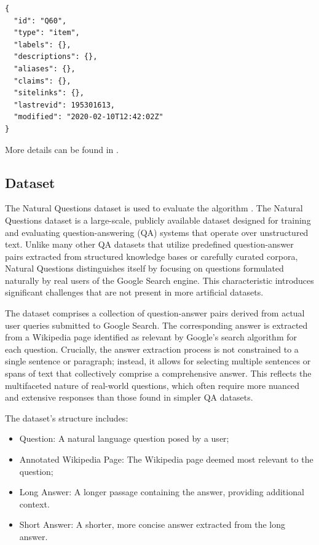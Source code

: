 \documentclass{article}
\begin{document}
\begin{lstlisting}
{
  "id": "Q60",
  "type": "item",
  "labels": {},
  "descriptions": {},
  "aliases": {},
  "claims": {},
  "sitelinks": {},
  "lastrevid": 195301613,
  "modified": "2020-02-10T12:42:02Z"
}
\end{lstlisting}

More details can be found in \cite{wikidata-structure}.

\subsection{Dataset}

The Natural Questions dataset is used to evaluate the algorithm \cite{natural-questions}. The Natural Questions dataset is a large-scale, publicly available dataset designed for training and evaluating question-answering (QA) systems that operate over unstructured text. Unlike many other QA datasets that utilize predefined question-answer pairs extracted from structured knowledge bases or carefully curated corpora, Natural Questions distinguishes itself by focusing on questions formulated naturally by real users of the Google Search engine. This characteristic introduces significant challenges that are not present in more artificial datasets.

The dataset comprises a collection of question-answer pairs derived from actual user queries submitted to Google Search. The corresponding answer is extracted from a Wikipedia page identified as relevant by Google's search algorithm for each question. Crucially, the answer extraction process is not constrained to a single sentence or paragraph; instead, it allows for selecting multiple sentences or spans of text that collectively comprise a comprehensive answer. This reflects the multifaceted nature of real-world questions, which often require more nuanced and extensive responses than those found in simpler QA datasets.

The dataset's structure includes:

\begin{itemize}
    \item Question: A natural language question posed by a user;
    \item Annotated Wikipedia Page:  The Wikipedia page deemed most relevant to the question;
    \item Long Answer:  A longer passage containing the answer, providing additional context.
    \item Short Answer:  A shorter, more concise answer extracted from the long answer.
\end{itemize}
\end{document}
